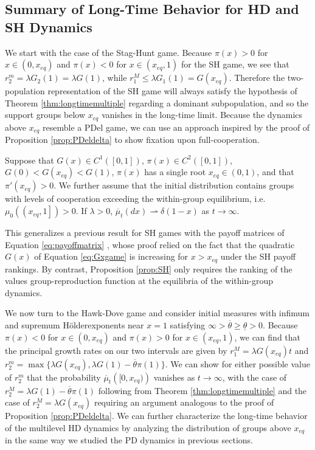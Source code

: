 \documentclass[11pt]{article}
\numberwithin{equation}{section}
\newcommand{\ol}{\overline}
\newcommand{\myindent}{\hspace{10mm}}
\newcommand{\holder}{H{\"o}lder\:}
\begin{document}
{ 
\subsection{Summary of Long-Time Behavior for HD and SH Dynamics} 
\label{sec:HDresults}  


We start with the case of the Stag-Hunt game. Because $\pi(x) > 0$ for $x \in (0,x_{eq})$ and $\pi(x) < 0$ for $x \in (x_{eq},1)$ for the SH game, we see that $r_2^m = \lambda G_2(1) = \lambda G(1)$, while $r_1^M \leq \lambda G_1(1) = G(x_{eq})$. Therefore the two-population representation of the SH game will always satisfy the hypothesis of Theorem \ref{thm:longtimemultiple} regarding a dominant subpopulation, and so the support groups below $x_{eq}$ vanishes in the long-time limit. Because the dynamics above $x_{eq}$ resemble a PDel game, we can use an approach inspired by the proof of Proposition \ref{prop:PDeldelta} to show fixation upon full-cooperation.
\begin{proposition} \label{prop:SH}
Suppose that $G(x) \in C^1([0,1])$, $\pi(x) \in C^2([0,1])$, $G(0) < G(x_{eq}) < G(1)$, $\pi(x)$ has a single root $x_{eq} \in (0,1)$, and 
that $\pi'(x_{eq}) > 0$. We further assume that the initial distribution contains groups with levels of cooperation exceeding the within-group equilibrium, i.e. $\mu_0\left(\left(x_{eq},1\right]\right) > 0$. If $\lambda > 0$, $\ol{\mu}_t(dx) \rightharpoonup \delta(1-x)$ as $t \to \infty$.
\end{proposition}
%
 This generalizes a previous result for SH games with the payoff matrices of Equation \eqref{eq:payoffmatrix} \cite{cooney2020analysis}, whose proof relied on the fact that the quadratic $G(x)$ of Equation \eqref{eq:Gxgame} is increasing for $x > x_{eq}$ under the SH payoff rankings. By contrast, Proposition \ref{prop:SH} only requires the ranking of the values group-reproduction function at the equilibria of the within-group dynamics. 
 

\myindent We now turn to the Hawk-Dove game and consider initial measures with infimum and supremum \holder exponents near $x=1$ satisfying $\infty > \overline{\theta} \geq \underline{\theta} > 0$. Because $\pi(x) < 0$ for $x \in (0,x_{eq})$ and $\pi(x) > 0$ for $x \in (x_{eq},1)$, we can find that the principal growth rates on our two intervals are given by $r_1^M = \lambda G(x_{eq})t$ and $r_2^m = \max\{\lambda G(x_{eq}), \lambda G(1) - \overline{\theta} \pi(1) \}$. We can show for either possible value of $r_2^m$ that the probability $\ol{\mu}_t\left([0,x_{eq})\right)$ vanishes as $t \to \infty$, with the case of $r_2^M = \lambda G(1) - \overline{\theta} \pi(1)$ following from Theorem \ref{thm:longtimemultiple} and the case of $r_2^M = \lambda G(x_{eq})$ requiring an argument analogous to the proof of Proposition \ref{prop:PDeldelta}. We can further characterize the long-time behavior of the multilevel HD dynamics by analyzing the distribution of groups above $x_{eq}$ in the same way we studied the PD dynamics in previous sections. %

}
\end{document}
